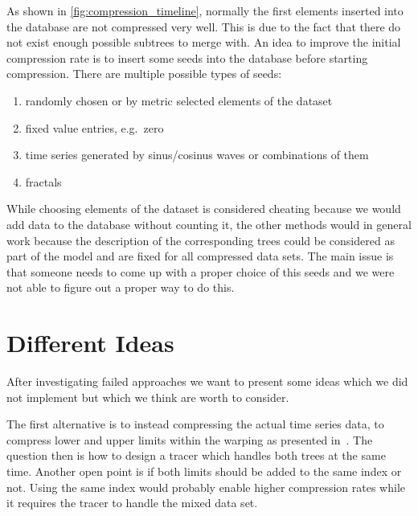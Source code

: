 As shown in \autoref{fig:compression_timeline}, normally the first elements inserted into the database are not compressed very well. This is due to the fact that there do not exist enough possible subtrees to merge with. An idea to improve the initial compression rate is to insert some seeds into the database before starting compression. There are multiple possible types of seeds:

\begin{enumerate}
    \item randomly chosen or by metric selected elements of the dataset
    \item fixed value entries, e.g.\ zero
    \item time series generated by sinus/cosinus waves or combinations of them
    \item fractals
\end{enumerate}

While choosing elements of the dataset is considered cheating because we would add data to the database without counting it, the other methods would in general work because the description of the corresponding trees could be considered as part of the model and are fixed for all compressed data sets. The main issue is that someone needs to come up with a proper choice of this seeds and we were not able to figure out a proper way to do this.



\section{Different Ideas}
\label{sec:algorithm:alternatives}

After investigating failed approaches we want to present some ideas which we did not implement but which we think are worth to consider.

The first alternative is to instead compressing the actual time series data, to compress lower and upper limits within the warping as presented in~\cite{LB_Keogh}. The question then is how to design a tracer which handles both trees at the same time. Another open point is if both limits should be added to the same index or not. Using the same index would probably enable higher compression rates while it requires the tracer to handle the mixed data set.

